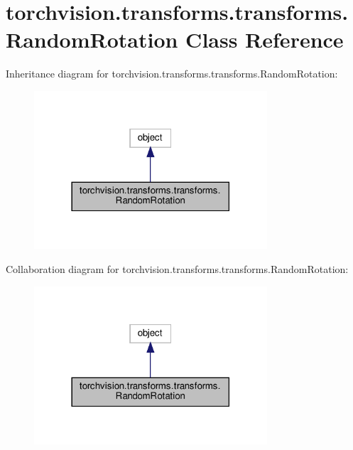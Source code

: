\hypertarget{classtorchvision_1_1transforms_1_1transforms_1_1RandomRotation}{}\section{torchvision.\+transforms.\+transforms.\+Random\+Rotation Class Reference}
\label{classtorchvision_1_1transforms_1_1transforms_1_1RandomRotation}


Inheritance diagram for torchvision.\+transforms.\+transforms.\+Random\+Rotation\+:
\nopagebreak
\begin{figure}[H]
\begin{center}
\leavevmode
\includegraphics[width=246pt]{classtorchvision_1_1transforms_1_1transforms_1_1RandomRotation__inherit__graph}
\end{center}
\end{figure}


Collaboration diagram for torchvision.\+transforms.\+transforms.\+Random\+Rotation\+:
\nopagebreak
\begin{figure}[H]
\begin{center}
\leavevmode
\includegraphics[width=246pt]{classtorchvision_1_1transforms_1_1transforms_1_1RandomRotation__coll__graph}
\end{center}
\end{figure}
